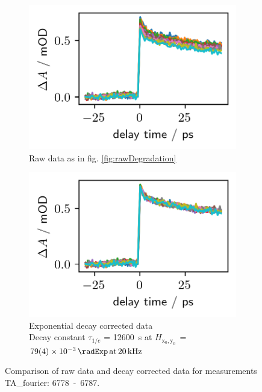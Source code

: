 \documentclass[twoside,openright,listof=numbered]{scrreprt}
\def\pumpExp#1{\ensuremath{\SI{#1}{\radExp}\,\mathrm{at}\, \SI{20}{\kilo\hertz}}}
\def\radiantExp{\ensuremath{H_\mathrm{x_0,y_0}}}
\begin{document}
\begin{figure}[hbtp]
\centering
\begin{subfigure}[t]{0.4\linewidth}
\centering
\includegraphics[scale=1]{images/DegradationRAWPump653Probe493-Graph.png}
\caption{Raw data as in fig. \ref{fig:rawDegradation}}
\end{subfigure}
\hfill
\begin{subfigure}[t]{0.4\linewidth}
\centering
\includegraphics[scale=1]{images/DegradationCorrectedPump653Probe493-Graph.png}
\caption{Exponential decay corrected data\\
Decay constant $\tau_{1/e}$ = \SI{12600}{\second} at $\radiantExp\,=\;$\pumpExp{79(4)e-3}}
\end{subfigure}
\caption{Comparison of raw data and decay corrected data for measurements TA\_fourier: \mbox{6778 - 6787}.\label{fig:degradationCorrectionComparison}}
\end{figure}
\end{document}
